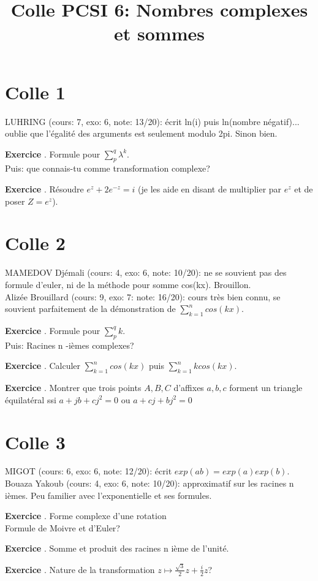 \documentclass[10pt,a4paper]{article}
\title{Colle PCSI 6: Nombres complexes et sommes}
\newcounter{question}
\newcounter{exo}
\newenvironment{exo}{\vspace{0.5cm}\setcounter{question}{0}\addtocounter{exo}{1} \noindent \textbf{Exercice \theexo}. \normalsize }{\par}
\begin{document}
	\maketitle

	\section*{Colle 1}
	LUHRING (cours: 7, exo: 6, note: 13/20): écrit ln(i) puis ln(nombre négatif)... oublie que l'égalité des arguments est seulement modulo 2pi. Sinon bien.
	
	\begin{exo}
		Formule pour $\sum_p^q \lambda^k$.\\
		Puis: que connais-tu comme transformation complexe?
	\end{exo}

	\begin{exo}
		Résoudre $e^z + 2 e^{-z} = i$ (je les aide en disant de multiplier par $e^z$ et de poser $Z = e^z$).
	\end{exo}
	
	\section*{Colle 2}
	\setcounter{exo}{0}
	MAMEDOV Djémali (cours: 4, exo: 6, note: 10/20): ne se souvient pas des formule d'euler, ni de la méthode pour somme cos(kx). Brouillon.\\
	
	Alizée Brouillard (cours: 9, exo: 7: note: 16/20): cours très bien connu, se souvient parfaitement de la démonstration de $\sum_{k=1}^{n} cos(k x)$. 
	
	\begin{exo}
		Formule pour $\sum_p^q k$.\\
		Puis: Racines n -ièmes complexes?
	\end{exo}
	
	\begin{exo}
		Calculer $\sum_{k=1}^{n} cos(k x)$ puis $\sum_{k=1}^{n} k cos(k x)$.
	\end{exo}	
	
	\begin{exo}
		Montrer que trois points $A, B, C$ d'affixes $a, b, c$ forment un triangle équilatéral ssi $a + jb + c j^2 = 0$ ou $a + c j + b j^2  = 0$
	\end{exo}
	
	\section*{Colle 3}
	\setcounter{exo}{0}
	MIGOT (cours: 6, exo: 6, note: 12/20): écrit $exp(ab) =exp(a) exp(b)$.\\
	Bouaza Yakoub (cours: 4, exo: 6, note: 10/20): approximatif sur les racines n ièmes. Peu familier avec l'exponentielle et ses formules.
	
	\begin{exo}
		Forme complexe d'une rotation\\
		Formule de Moivre et d'Euler?
	\end{exo}
	
	\begin{exo}
		Somme et produit des racines n ième de l'unité.
	\end{exo}
	
	\begin{exo}
		Nature de la transformation $z \longmapsto \frac{\sqrt{3}}{2} z + \frac{i}{2} z$?
	\end{exo}
	
\end{document}
